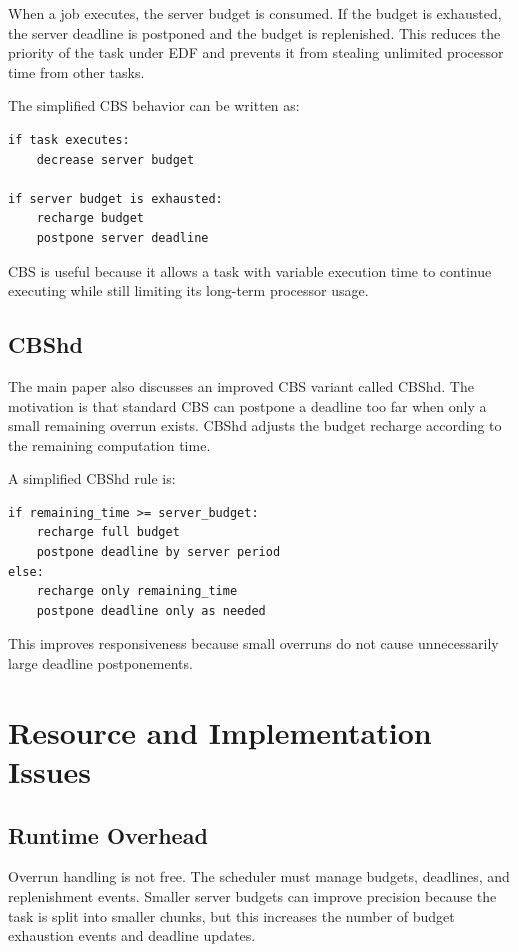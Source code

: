\documentclass[conference]{IEEEtran}
\begin{document}
When a job executes, the server budget is consumed. If the budget is exhausted, the server deadline is postponed and the budget is replenished. This reduces the priority of the task under EDF and prevents it from stealing unlimited processor time from other tasks.

The simplified CBS behavior can be written as:

\begin{lstlisting}
if task executes:
    decrease server budget

if server budget is exhausted:
    recharge budget
    postpone server deadline
\end{lstlisting}

CBS is useful because it allows a task with variable execution time to continue executing while still limiting its long-term processor usage.

\subsection{CBShd}

The main paper also discusses an improved CBS variant called CBShd. The motivation is that standard CBS can postpone a deadline too far when only a small remaining overrun exists. CBShd adjusts the budget recharge according to the remaining computation time.

A simplified CBShd rule is:

\begin{lstlisting}
if remaining_time >= server_budget:
    recharge full budget
    postpone deadline by server period
else:
    recharge only remaining_time
    postpone deadline only as needed
\end{lstlisting}

This improves responsiveness because small overruns do not cause unnecessarily large deadline postponements.

\section{Resource and Implementation Issues}

\subsection{Runtime Overhead}

Overrun handling is not free. The scheduler must manage budgets, deadlines, and replenishment events. Smaller server budgets can improve precision because the task is split into smaller chunks, but this increases the number of budget exhaustion events and deadline updates.
\end{document}
